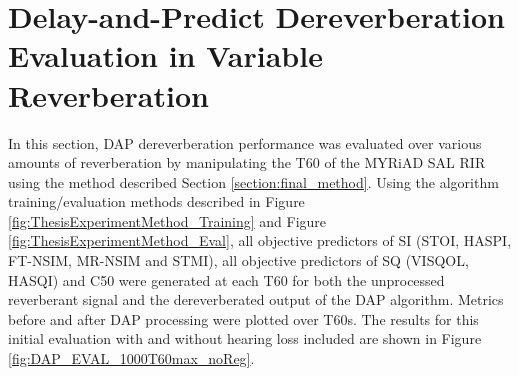\section{Delay-and-Predict Dereverberation Evaluation in Variable Reverberation} \label{section:dap_eval_truncSAL}

In this section, DAP dereverberation performance was evaluated over various amounts of reverberation by manipulating the T60 of the MYRiAD SAL RIR using the method described Section \ref{section:final_method}. Using the algorithm training/evaluation methods described in Figure \ref{fig:ThesisExperimentMethod_Training} and Figure \ref{fig:ThesisExperimentMethod_Eval}, all objective predictors of SI (STOI, HASPI, FT-NSIM, MR-NSIM and STMI), all objective predictors of SQ (VISQOL, HASQI) and C50 were generated at each T60 for both the unprocessed reverberant signal and the dereverberated output of the DAP algorithm. Metrics before and after DAP processing were plotted over T60s. The results for this initial evaluation with and without hearing loss included are shown in Figure \ref{fig:DAP_EVAL_1000T60max_noReg}.

	

